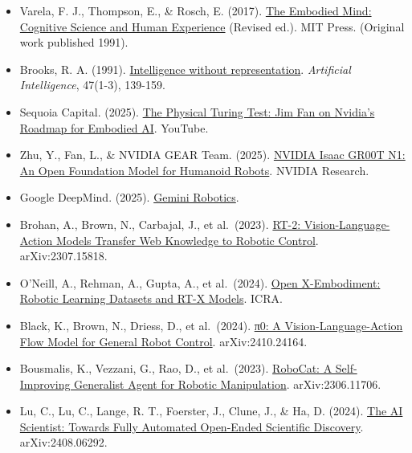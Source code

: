 \begin{itemize}
\tightlist
\item
  Varela, F. J., Thompson, E., \& Rosch, E. (2017). \href{https://mitpress.mit.edu/9780262529365/the-embodied-mind/}{The Embodied Mind: Cognitive Science and Human Experience} (Revised ed.). MIT Press. (Original work published 1991).
\item
  Brooks, R. A. (1991). \href{https://doi.org/10.1016/0004-3702\%2891\%2990053-M}{Intelligence without representation}. \emph{Artificial Intelligence}, 47(1-3), 139-159.
\item
  Sequoia Capital. (2025). \href{https://www.youtube.com/watch?v=_2NijXqBESI}{The Physical Turing Test: Jim Fan on Nvidia's Roadmap for Embodied AI}. YouTube.
\item
  Zhu, Y., Fan, L., \& NVIDIA GEAR Team. (2025). \href{https://research.nvidia.com/publication/2025-03_nvidia-isaac-gr00t-n1-open-foundation-model-humanoid-robots}{NVIDIA Isaac GR00T N1: An Open Foundation Model for Humanoid Robots}. NVIDIA Research.
\item
  Google DeepMind. (2025). \href{https://deepmind.google/models/gemini-robotics/}{Gemini Robotics}.
\item
  Brohan, A., Brown, N., Carbajal, J., et al.~(2023). \href{https://arxiv.org/abs/2307.15818}{RT-2: Vision-Language-Action Models Transfer Web Knowledge to Robotic Control}. arXiv:2307.15818.
\item
  O'Neill, A., Rehman, A., Gupta, A., et al.~(2024). \href{https://arxiv.org/abs/2310.08864}{Open X-Embodiment: Robotic Learning Datasets and RT-X Models}. ICRA.
\item
  Black, K., Brown, N., Driess, D., et al.~(2024). \href{https://arxiv.org/abs/2410.24164}{π0: A Vision-Language-Action Flow Model for General Robot Control}. arXiv:2410.24164.
\item
  Bousmalis, K., Vezzani, G., Rao, D., et al.~(2023). \href{https://arxiv.org/abs/2306.11706}{RoboCat: A Self-Improving Generalist Agent for Robotic Manipulation}. arXiv:2306.11706.
\item
  Lu, C., Lu, C., Lange, R. T., Foerster, J., Clune, J., \& Ha, D. (2024). \href{https://arxiv.org/abs/2408.06292}{The AI Scientist: Towards Fully Automated Open-Ended Scientific Discovery}. arXiv:2408.06292.
\end{itemize}

\clearpage

